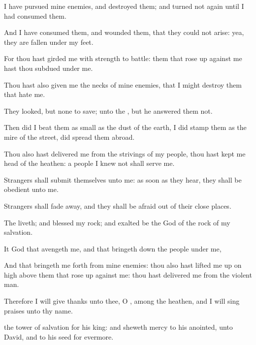 {I have
pursued mine
enemies, and
destroyed them; and turned not
again until I had
consumed them.

And I have
consumed them, and
wounded them, that they could not
arise: yea, they are
fallen under my
feet.

For thou hast
girded me with
strength to
battle: them that rose
up against me hast thou
subdued under me.

Thou hast also
given me the
necks of mine
enemies, that I might
destroy them that
hate me.

They
looked, but
{} none to
save;
{} unto the
{}, but he
answered them not.

Then did I
beat them as small as the
dust of the
earth, I did
stamp them as the
mire of the
street,
{} did spread them
abroad.

Thou also hast
delivered me from the
strivings of my
people, thou hast
kept me
{}
head of the
heathen: a
people
{} I
knew not shall
serve me.

Strangers shall
submit themselves unto me: as soon as they
hear, they shall be
obedient unto me.

Strangers shall fade
away, and they shall be
afraid out of their close
places.

The
{}
liveth; and
blessed
{} my
rock; and
exalted be the
God of the
rock of my
salvation.

It
{}
God that
avengeth me, and that bringeth
down the
people under me,

And that bringeth me
forth from mine
enemies: thou also hast lifted me up on
high above them that rose
up against me: thou hast
delivered me from the
violent
man.

Therefore I will give
thanks unto thee, O
{}, among the
heathen, and I will sing
praises unto thy
name.

 the
tower of
salvation for his
king: and
sheweth
mercy to his
anointed, unto
David, and to his
seed
for
evermore.




\par }
